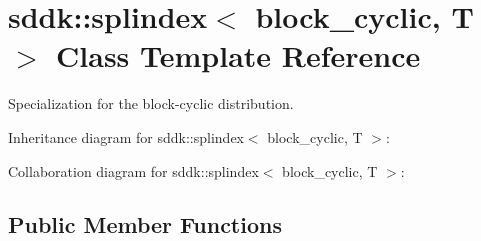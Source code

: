 \hypertarget{classsddk_1_1splindex_3_01block__cyclic_00_01_t_01_4}{}\section{sddk\+:\+:splindex$<$ block\+\_\+cyclic, T $>$ Class Template Reference}
\label{classsddk_1_1splindex_3_01block__cyclic_00_01_t_01_4}


Specialization for the block-\/cyclic distribution.  




Inheritance diagram for sddk\+:\+:splindex$<$ block\+\_\+cyclic, T $>$\+:


Collaboration diagram for sddk\+:\+:splindex$<$ block\+\_\+cyclic, T $>$\+:
\subsection*{Public Member Functions}
